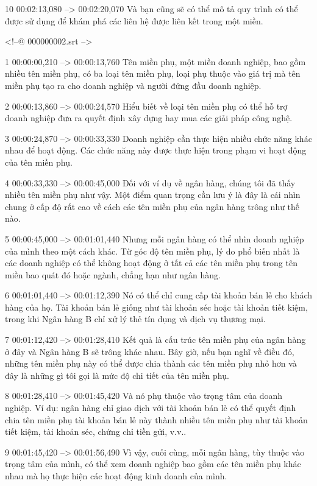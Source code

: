 10
00:02:13,080 --> 00:02:20,070
Và bạn cũng sẽ có thể mô tả quy trình có thể được sử dụng để khám phá các liên hệ được liên kết trong một miền.

<!--@ 000000002.srt -->

1
00:00:00,210 --> 00:00:13,760
Tên miền phụ, một miền doanh nghiệp, bao gồm nhiều tên miền phụ, có ba loại tên miền phụ, loại phụ thuộc vào giá trị mà tên miền phụ tạo ra cho doanh nghiệp và người đứng đầu doanh nghiệp.

2
00:00:13,860 --> 00:00:24,570
Hiểu biết về loại tên miền phụ có thể hỗ trợ doanh nghiệp đưa ra quyết định xây dựng hay mua các giải pháp công nghệ.

3
00:00:24,870 --> 00:00:33,330
Doanh nghiệp cần thực hiện nhiều chức năng khác nhau để hoạt động.  Các chức năng này được thực hiện trong phạm vi hoạt động của tên miền phụ.

4
00:00:33,330 --> 00:00:45,000
Đối với ví dụ về ngân hàng, chúng tôi đã thấy nhiều tên miền phụ như vậy.  Một điểm quan trọng cần lưu ý là đây là cái nhìn chung ở cấp độ rất cao về cách các tên miền phụ của ngân hàng trông như thế nào.

5
00:00:45,000 --> 00:01:01,440
Nhưng mỗi ngân hàng có thể nhìn doanh nghiệp của mình theo một cách khác.  Từ góc độ tên miền phụ, lý do phổ biến nhất là các doanh nghiệp có thể không hoạt động ở tất cả các tên miền phụ trong tên miền bao quát đó hoặc ngành, chẳng hạn như ngân hàng.

6
00:01:01,440 --> 00:01:12,390
Nó có thể chỉ cung cấp tài khoản bán lẻ cho khách hàng của họ.  Tài khoản bán lẻ giống như tài khoản séc hoặc tài khoản tiết kiệm, trong khi Ngân hàng B chỉ xử lý thẻ tín dụng và dịch vụ thương mại.

7
00:01:12,420 --> 00:01:28,410
Kết quả là cấu trúc tên miền phụ của ngân hàng ở đây và Ngân hàng B sẽ trông khác nhau.  Bây giờ, nếu bạn nghĩ về điều đó, những tên miền phụ này có thể được chia thành các tên miền phụ nhỏ hơn và đây là những gì tôi gọi là mức độ chi tiết của tên miền phụ.

8
00:01:28,410 --> 00:01:45,420
Và nó phụ thuộc vào trọng tâm của doanh nghiệp.  Ví dụ: ngân hàng chỉ giao dịch với tài khoản bán lẻ có thể quyết định chia tên miền phụ tài khoản bán lẻ này thành nhiều tên miền phụ như tài khoản tiết kiệm, tài khoản séc, chứng chỉ tiền gửi, v.v..

9
00:01:45,420 --> 00:01:56,490
Vì vậy, cuối cùng, mỗi ngân hàng, tùy thuộc vào trọng tâm của mình, có thể xem doanh nghiệp bao gồm các tên miền phụ khác nhau mà họ thực hiện các hoạt động kinh doanh của mình.

